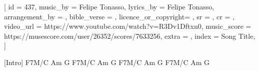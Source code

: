 [
    id                  = {437},
    music_by            = {Felipe Tonasso}, %
    lyrics_by           = {Felipe Tonasso}, %
    arrangement_by      = {}, %
    bible_verse         = {},
    licence_or_copyright= {},
    sr                  = {},
    cr                  = {},
    video_url           = {https://www.youtube.com/watch?v=R3Dv1Dftxn0},
    music_score         = {https://musescore.com/user/26352/scores/7633256},
    extra               = {},
    index               = {Song Title},
]

\beginverse

[Intro] F7M/C  Am  G
        F7M/C  Am  G
        F7M/C  Am  G
        F7M/C  Am  G

